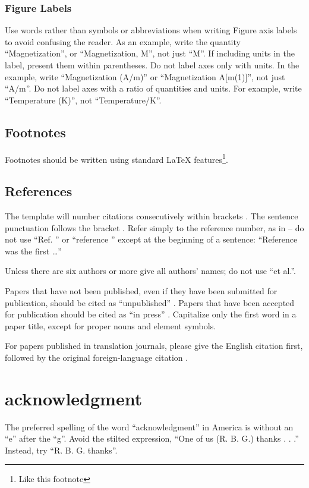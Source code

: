 \documentclass{MIPRO}
\begin{document}
\subsubsection{Figure Labels}

Use words rather than symbols or abbreviations when writing Figure axis labels to avoid confusing the reader. As an example, write the quantity “Magnetization”, or “Magnetization, M”, not just “M”. If including units in the label, present them within parentheses. Do not label axes only with units. In the example, write “Magnetization (A/m)” or “Magnetization {A[m(1)]}”, not just “A/m”. Do not label axes with a ratio of quantities and units. For example, write “Temperature (K)”, not “Temperature/K”.

\subsection{Footnotes}

Footnotes should be written using standard \LaTeX{} features\footnote{Like this footnote}.

\subsection{References}

The template will number citations consecutively within brackets \cite{eason1955certain}. The sentence punctuation follows the bracket \cite{maxwell1873treatise}. Refer simply to the reference number, as in \cite{jacobs1963fine} -- do not use “Ref. \cite{jacobs1963fine}” or “reference \cite{jacobs1963fine}” except at the beginning of a sentence: “Reference \cite{jacobs1963fine} was the first \ldots”

Unless there are six authors or more give all authors' names; do not use “et al.”.

Papers that have not been published, even if they have been submitted for publication, should be cited as “unpublished” \cite{elissa}. Papers that have been accepted for publication should be cited as “in press” \cite{nicole}. Capitalize only the first word in a paper title, except for proper nouns and element symbols.

For papers published in translation journals, please give the English citation first, followed by the original foreign-language citation \cite{yorozu1987electron}.

\section*{acknowledgment}

The preferred spelling of the word “acknowledgment” in America is without an “e” after the “g”. Avoid the stilted expression, “One of us (R. B. G.) thanks . . .”  Instead, try “R. B. G. thanks”. 



\end{document}
